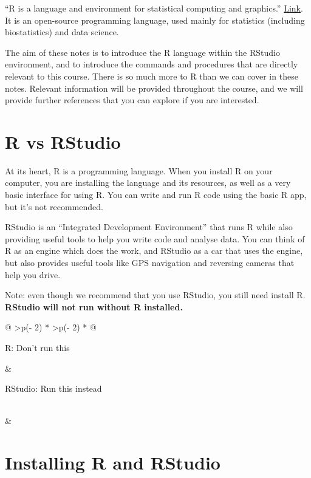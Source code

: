 \documentclass[
]{memoir}
\begin{document}
``R is a language and environment for statistical computing and graphics.'' \href{https://www.r-project.org/about.html}{Link}. It is an open-source programming language, used mainly for statistics (including biostatistics) and data science.

The aim of these notes is to introduce the R language within the RStudio environment, and to introduce the commands and procedures that are directly relevant to this course. There is so much more to R than we can cover in these notes. Relevant information will be provided throughout the course, and we will provide further references that you can explore if you are interested.

\hypertarget{r-vs-rstudio}{%
\section{R vs RStudio}\label{r-vs-rstudio}}

At its heart, R is a programming language. When you install R on your computer, you are installing the language and its resources, as well as a very basic interface for using R. You can write and run R code using the basic R app, but it's not recommended.

RStudio is an ``Integrated Development Environment'' that runs R while also providing useful tools to help you write code and analyse data. You can think of R as an engine which does the work, and RStudio as a car that uses the engine, but also provides useful tools like GPS navigation and reversing cameras that help you drive.

Note: even though we recommend that you use RStudio, you still need install R. \textbf{RStudio will not run without R installed.}

\begin{longtable}[]{@{}
  >{\centering\arraybackslash}p{(\columnwidth - 2\tabcolsep) * }
  >{\centering\arraybackslash}p{(\columnwidth - 2\tabcolsep) * }@{}}
\toprule
\begin{minipage}[b]{\linewidth}\centering
R: Don't run this
\end{minipage} & \begin{minipage}[b]{\linewidth}\centering
RStudio: Run this instead
\end{minipage} \\
\midrule
\endhead
& \\
\bottomrule
\end{longtable}

\hypertarget{installing-r-and-rstudio}{%
\section{Installing R and RStudio}\label{installing-r-and-rstudio}}
\end{document}
